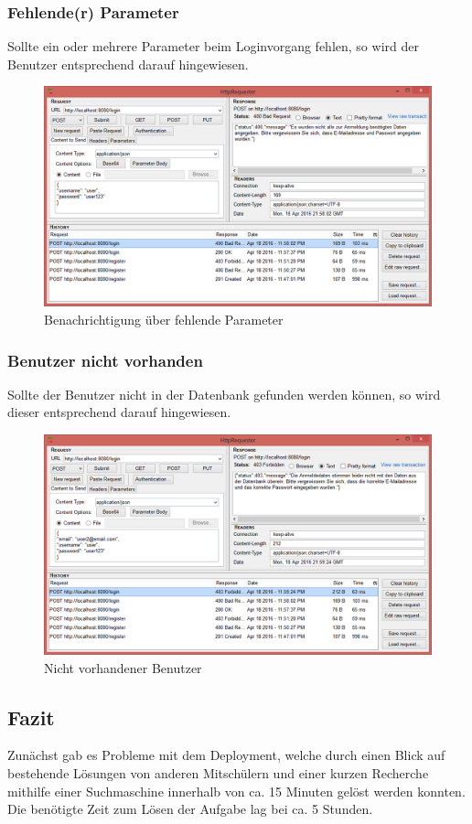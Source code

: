 \subsubsection{Fehlende(r) Parameter}

Sollte ein oder mehrere Parameter beim Loginvorgang fehlen, so wird der Benutzer entsprechend darauf hingewiesen.

\begin{figure}[H]
	\includegraphics[width=1\textwidth]{images/login_param_missing.png}
	\caption{Benachrichtigung über fehlende Parameter}
\end{figure}
\clearpage

\subsubsection{Benutzer nicht vorhanden}

Sollte der Benutzer nicht in der Datenbank gefunden werden können, so wird dieser entsprechend darauf hingewiesen.

\begin{figure}[H]
	\includegraphics[width=1\textwidth]{images/login_not_registered.png}
	\caption{Nicht vorhandener Benutzer}
\end{figure}

\subsection{Fazit}
Zunächst gab es Probleme mit dem Deployment, welche durch einen Blick auf bestehende Lösungen von anderen Mitschülern und einer kurzen Recherche mithilfe einer Suchmaschine innerhalb von ca. 15 Minuten gelöst werden konnten. Die benötigte Zeit zum Lösen der Aufgabe lag bei ca. 5 Stunden.
